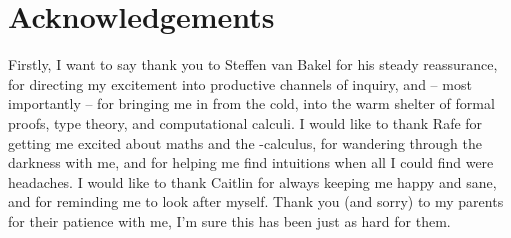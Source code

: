 \chapter*{Acknowledgements}

Firstly, I want to say thank you to Steffen van Bakel for his steady reassurance,
for directing my excitement into productive channels of inquiry,
and -- most importantly -- for bringing me in from the cold, 
into the warm shelter of formal proofs, 
type theory, 
and computational calculi.
I would like to thank Rafe for getting me excited about maths and the \lam-calculus, 
for wandering through the darkness with me, 
and for helping me find intuitions when all I could find were headaches.   
I would like to thank Caitlin for always keeping me happy and sane, 
and for reminding me to look after myself.
Thank you (and sorry) to my parents for their patience with me, I'm sure this has been just as hard for them.    
